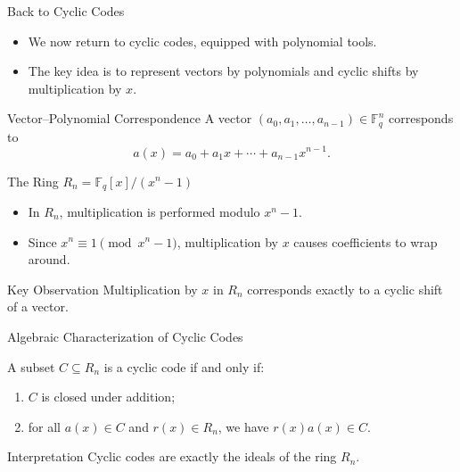 \documentclass[aspectratio=169,xcolor=dvipsnames]{beamer}
\begin{document}
	\begin{frame}{Back to Cyclic Codes}
		
		\begin{itemize}
			\item We now return to \alert{cyclic codes}, equipped with polynomial tools.
			\item The key idea is to represent vectors by polynomials and cyclic shifts by
			multiplication by $x$.
		\end{itemize}
		
		\begin{block}{Vector–Polynomial Correspondence}
			A vector $(a_0,a_1,\dots,a_{n-1}) \in \mathbb{F}_q^n$ corresponds to
			\[
			a(x) = a_0 + a_1 x + \cdots + a_{n-1} x^{n-1}.
			\]
		\end{block}
		
	\end{frame}
	
	\begin{frame}{The Ring $R_n = \mathbb{F}_q[x]/(x^n - 1)$}
		
		\begin{itemize}
			\item In $R_n$, multiplication is performed modulo $x^n - 1$.
			\item Since $x^n \equiv 1 \pmod{x^n - 1}$, multiplication by $x$
			causes coefficients to wrap around.
		\end{itemize}
		
		\begin{alertblock}{Key Observation}
			Multiplication by $x$ in $R_n$ corresponds exactly to a cyclic shift of a vector.
		\end{alertblock}
		
	\end{frame}
	
	\begin{frame}{Algebraic Characterization of Cyclic Codes}
		
		\begin{theorem}
			A subset $C \subseteq R_n$ is a cyclic code if and only if:
			\begin{enumerate}
				\item $C$ is closed under addition;
				\item for all $a(x) \in C$ and $r(x) \in R_n$, we have $r(x)a(x) \in C$.
			\end{enumerate}
		\end{theorem}
		
		\begin{block}{Interpretation}
			Cyclic codes are exactly the \alert{ideals} of the ring $R_n$.
		\end{block}
		
	\end{frame}
	
\end{document}

